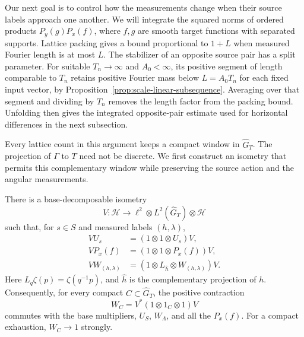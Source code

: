 Our next goal is to control how the measurements change when their source
labels approach one another. We will integrate the squared norms of
ordered products $P_y(g)P_x(f)$, where $f,g$ are smooth target functions
with separated supports.
Lattice packing gives a bound proportional to $1+L$ when measured Fourier
length is at most $L$. The stabilizer of an opposite source pair has a
split parameter. For suitable $T_n\to\infty$ and $A_0<\infty$, its
positive segment of length comparable to $T_n$ retains positive Fourier
mass below $L=A_0T_n$ for each fixed input vector, by
Proposition~\ref{prop:scale-linear-subsequence}. Averaging over that segment
and dividing by $T_n$ removes the length factor from the packing bound.
Unfolding then gives the integrated opposite-pair estimate used for
horizontal differences in the next subsection.

Every lattice count in this argument keeps a compact window in
$\widehat G_T$. The projection of $\Gamma$ to $T$ need not be discrete.
We first construct an isometry that permits this complementary window
while preserving the source action and the angular measurements.

\begin{lemma}
\label{lem:scale-complement-isometry}
There is a base-decomposable isometry
\[
 V:\mathcal H\longrightarrow
 \ell^2\otimes L^2(\widehat G_T)\otimes\mathcal H
\]
such that, for $s\in S$ and measured labels $(h,\lambda)$,
\begin{align*}
 VU_s&=(1\otimes1\otimes U_s)V,\\
 VP_x(f)&=(1\otimes1\otimes P_x(f))V,\\
 VW_{(h,\lambda)}
  &=(1\otimes L_{\hat h}\otimes W_{(h,\lambda)})V.
\end{align*}
Here $L_q\zeta(p)=\zeta(q^{-1}p)$, and $\hat h$ is the complementary
projection of $h$.  Consequently, for every compact
$C\subset\widehat G_T$, the positive contraction
\[
 W_C=V^*(1\otimes1_C\otimes1)V
\]
commutes with the base multipliers, $U_S$, $W_\Lambda$, and all the
$P_x(f)$.  For a compact exhaustion, $W_C\to1$ strongly.
\end{lemma}

